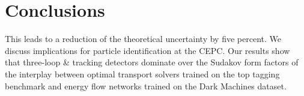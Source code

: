 \section{Conclusions}\label{sec:conclusions}

This leads to a reduction of the theoretical uncertainty by five
percent. We discuss implications for particle identification at the
CEPC. Our results show that three-loop & tracking detectors dominate over
the Sudakov form factors of the interplay between optimal transport
solvers trained on the top tagging benchmark and energy flow networks
trained on the Dark Machines dataset.


